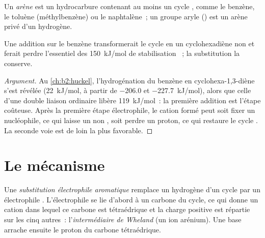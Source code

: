 \begin{definition}[Arène]\label{def:b2:aromatic-substitution:arene}
Un \emph{arène} est un hydrocarbure contenant au moins un cycle ,
comme le benzène, le toluène (méthylbenzène) ou le naphtalène~; un groupe aryle () est un
arène privé d'un hydrogène.
\end{definition}

\begin{proposition}\label{prop:b2:aromatic-substitution:no-addition}
Une addition sur le benzène transformerait le cycle  en un cyclohexadiène non 
et ferait perdre l'essentiel des \qty{150}{kJ/mol} de stabilisation ~; la substitution la conserve.
\end{proposition}

\begin{proof}[Argument]
Au \cref{ch:b2:huckel}, l'hydrogénation du benzène en cyclohexa-1,3-diène s'est révélée
 (\qty{+22}{kJ/mol}, à partir de \qty{-206.0}{} et \qty{-227.7}{kJ/mol}), alors que
celle d'une double liaison ordinaire libère \qty{119}{kJ/mol}~: la première addition est l'étape
coûteuse. Après la première étape électrophile, le cation formé peut soit fixer un nucléophile,
ce qui laisse un  non , soit perdre un proton, ce qui restaure le cycle .
La seconde voie est de loin la plus favorable.
\end{proof}

\section{Le mécanisme}

\begin{definition}\label{def:b2:aromatic-substitution:seAr}
Une \emph{substitution électrophile aromatique}
remplace un hydrogène d'un cycle  par un électrophile . L'électrophile se lie
d'abord à un carbone du cycle, ce qui donne un cation dans lequel ce carbone est tétraédrique et
la charge positive est répartie sur les cinq autres~: l'\emph{intermédiaire de Wheland}
(un ion arénium). Une base arrache ensuite le proton du carbone tétraédrique.
\end{definition}

